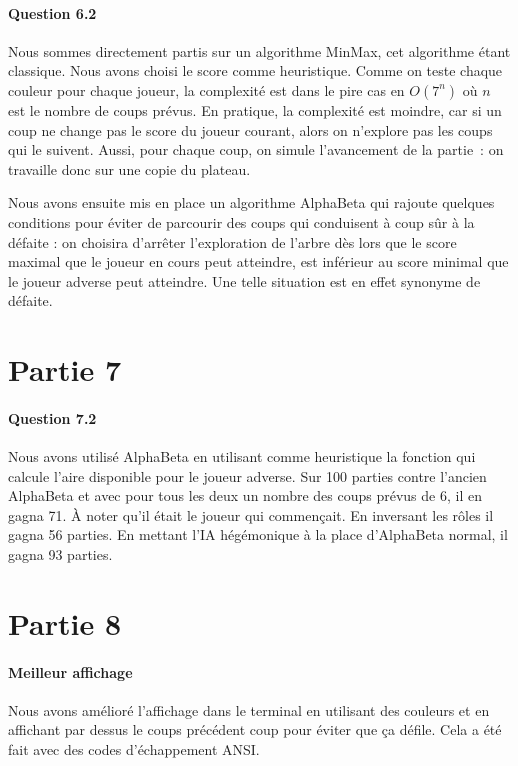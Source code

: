 \documentclass[a4paper]{article}
\begin{document}
    \paragraph{Question 6.2} Nous sommes directement partis sur un algorithme 
MinMax, cet algorithme étant classique. Nous avons choisi le score comme
    heuristique. Comme on teste chaque couleur pour chaque joueur, la complexité
    est dans le pire cas en $O(7^n)$ où $n$ est le nombre de coups prévus. En 
pratique, la complexité est moindre, car si un coup ne change pas le score du 
joueur courant, alors on n'explore pas les coups qui le suivent. 
Aussi, pour chaque coup, on simule l'avancement de la partie~: on travaille 
donc sur une copie du plateau. 

Nous avons ensuite mis en place un algorithme AlphaBeta qui rajoute quelques 
conditions pour éviter de parcourir des coups qui conduisent à coup sûr à la 
défaite : on choisira d'arrêter l'exploration de l'arbre dès lors que le score 
maximal que le joueur en cours peut atteindre, est inférieur au score minimal 
que le joueur adverse peut atteindre. Une telle situation est en effet synonyme 
de défaite.


    \section{Partie 7}
    \paragraph{Question 7.2} Nous avons utilisé AlphaBeta en utilisant comme
    heuristique la fonction qui calcule l'aire disponible pour le joueur
    adverse. Sur 100 parties contre l'ancien AlphaBeta et avec pour tous les
    deux un nombre des coups prévus de 6, il en gagna 71. À noter qu'il était
    le joueur qui commençait. En inversant les rôles il gagna 56 parties.
    En mettant l'IA hégémonique à la place d'AlphaBeta normal, il gagna 93
    parties.


    \section{Partie 8}
    \paragraph{Meilleur affichage} Nous avons amélioré l'affichage dans le
    terminal en utilisant des couleurs et en affichant par dessus le coups
    précédent coup pour éviter que ça défile. Cela a été fait avec des codes
    d'échappement ANSI.
\end{document}
